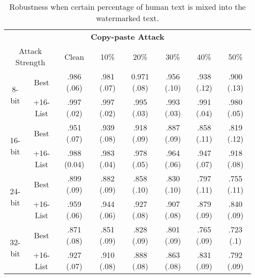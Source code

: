 \begin{table}[ht!]
\centering
\begin{adjustbox}{width=1.\columnwidth}
\begin{tabular}{cc|cccccc}
    \toprule
    \multicolumn{8}{c}{\textbf{Copy-paste Attack}} \\ 
    \multicolumn{2}{c}{Attack Strength} &  Clean  &  10\% &  20\%  &  30\% &  40\% & 50\% \\ \hline
    \multirow{2}{*}{8-bit} & Best & .986 (.06)  & .981 (.07) & 0.971 (.08) & .956 (.10) & .938 (.12) & .900 (.13) \\
     & +16-List & .997 (.02)  & .997 (.02) & .995 (.03)  & .993 (.03) & .991 (.04) & .980 (.05) \\
     \hline 
    \multirow{2}{*}{16-bit} & Best & .951 (.07)  & .939 (.08) & .918 (.09)  & .887 (.09) & .858 (.11) & .819 (.12) \\
     & +16-List & .988 (0.04) & .983 (.04) & .978 (.05)  & .964 (.06) & .947 (.07) & .918 (.08) \\
     \hline
    \multirow{2}{*}{24-bit} & Best & .899 (.09)  & .882 (.09) & .858 (.10)  & .830 (.10) & .797 (.11) & .755 (.11) \\
     & +16-List & .959 (.06)  & .944 (.06) & .927 (.08)  & .907 (.08) & .879 (.09) & .840 (.09) \\
     \hline
    \multirow{2}{*}{32-bit} & Best & .871 (.08)  & .851 (.09) & .828 (.09)  & .801 (.09) & .765 (.09) & .723 (.1)  \\
     & +16-List & .927 (.07)  & .910 (.08) & .888 (.08)  & .863 (.08) & .831 (.09) & .792 (.09) \\
    \bottomrule
\end{tabular}
\end{adjustbox}
\caption{Robustness when certain percentage of human text is mixed into the watermarked text.} \label{tab:robustness-cp}
\end{table}

